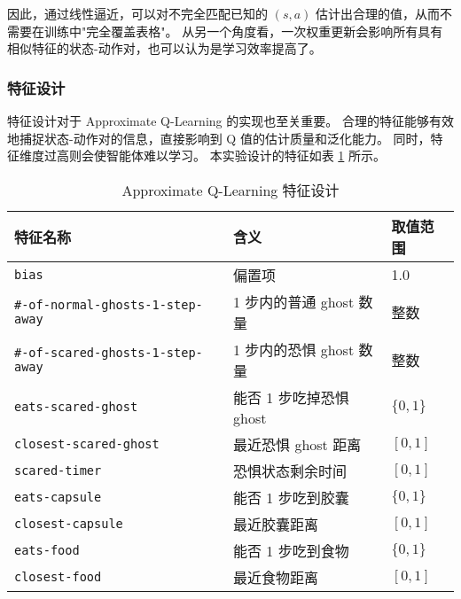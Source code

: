 因此，通过线性逼近，可以对不完全匹配已知的 $(s,a)$ 估计出合理的值，从而不需要在训练中"完全覆盖表格"。
从另一个角度看，一次权重更新会影响所有具有相似特征的状态-动作对，也可以认为是学习效率提高了。

\subsubsection{特征设计}


特征设计对于 Approximate Q-Learning 的实现也至关重要。
合理的特征能够有效地捕捉状态-动作对的信息，直接影响到 Q 值的估计质量和泛化能力。
同时，特征维度过高则会使智能体难以学习。
本实验设计的特征如表 \ref{tab:features} 所示。

\begin{table}[h]
    \renewcommand{\arraystretch}{1.5}
    \setlength{\tabcolsep}{8pt}
    \centering
    \caption{Approximate Q-Learning 特征设计}
    \small
    \begin{tabular}{lll}
        \toprule
        \textbf{特征名称} & \textbf{含义} & \textbf{取值范围} \\
        \midrule
        \texttt{bias} & 偏置项 & 1.0 \\
        \midrule
        \texttt{\#-of-normal-ghosts-1-step-away} & 1 步内的普通 ghost 数量 & 整数 \\
        \texttt{\#-of-scared-ghosts-1-step-away} & 1 步内的恐惧 ghost 数量 & 整数 \\
        \texttt{eats-scared-ghost} & 能否 1 步吃掉恐惧 ghost & $\{0, 1\}$ \\
        \texttt{closest-scared-ghost} & 最近恐惧 ghost 距离 & $[0, 1]$ \\
        \texttt{scared-timer} & 恐惧状态剩余时间 & $[0, 1]$ \\
        \midrule
        \texttt{eats-capsule} & 能否 1 步吃到胶囊 & $\{0, 1\}$ \\
        \texttt{closest-capsule} & 最近胶囊距离 & $[0, 1]$ \\
        \midrule
        \texttt{eats-food} & 能否 1 步吃到食物 & $\{0, 1\}$ \\
        \texttt{closest-food} & 最近食物距离 & $[0, 1]$ \\
        \bottomrule
    \end{tabular}
    \label{tab:features}
\end{table}

